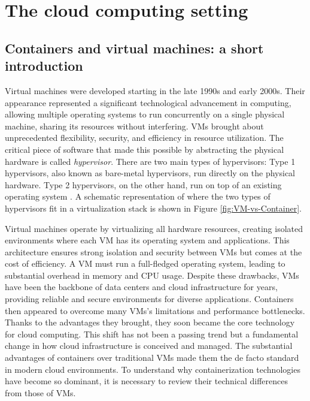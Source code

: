 \chapter{The cloud computing setting}\label{chap:cloudcomputing}


\section{Containers and virtual machines: a short introduction}\label{sec:chpt1-containers}

Virtual machines were developed starting in the late 1990s and early 2000s.
Their appearance represented a significant technological advancement in
computing, allowing multiple operating systems to run concurrently on a single
physical machine, sharing its resources without interfering.
VMs brought about unprecedented flexibility, security, and efficiency in
resource utilization.
The critical piece of software that made this possible by abstracting the physical
hardware is called \textit{hypervisor}.
There are two main types of hypervisors: Type 1 hypervisors, also known as
bare-metal hypervisors, run directly on the physical hardware.
Type 2 hypervisors, on the other hand, run on top of an existing operating
system \cite{rodriguezharo-2012}.
A schematic representation of where the two types of hypervisors fit in a
virtualization stack is shown in Figure \ref{fig:VM-vs-Container}.

Virtual machines operate by virtualizing all hardware resources, creating
isolated environments where each VM has its operating system and applications.
This architecture ensures strong isolation and security between VMs but comes at
the cost of efficiency.
A VM must run a full-fledged operating system, leading to substantial overhead
in memory and CPU usage.
Despite these drawbacks, VMs have been the backbone of data centers and cloud
infrastructure for years, providing reliable and secure environments for diverse
applications.
Containers then appeared to overcome many VMs's limitations and performance
bottlenecks.
Thanks to the advantages they brought, they soon became the core technology for
cloud computing.
This shift has not been a passing trend but a fundamental change in how cloud
infrastructure is conceived and managed\cite{Casalicchio2020TheSI, Bentaleb2021,
  zhang2018comparativestudycontainersvirtual}.
The substantial advantages of containers over traditional VMs made them the de
facto standard in modern cloud environments.
To understand why containerization technologies have become so dominant, it is
necessary to review their technical differences from those of VMs.

